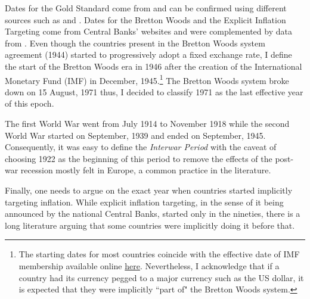 \documentclass[12pt]{article}
\begin{document}
\begin{appendices}
Dates for the Gold Standard come from \cite{Reinhart2009} and can be confirmed using different sources such as \cite{Bordo1996} and \cite{Diebold1991}. Dates for the Bretton Woods and the Explicit Inflation Targeting come from Central Banks' websites and were complemented by data from \cite{Ilzetzki2019}. Even though the countries present in the Bretton Woods system agreement (1944) started to progressively adopt a fixed exchange rate, I define the start of the Bretton Woods era in 1946 after the creation of the International Monetary Fund (IMF) in December, 1945.\footnote{The starting dates for most countries coincide with the effective date of IMF membership available online \href{https://www.imf.org/external/np/sec/memdir/memdate.htm}{here}. Nevertheless, I acknowledge that if a country had its currency pegged to a major currency such as the US dollar, it is expected that they were implicitly ``part of" the Bretton Woods system.} The Bretton Woods system broke down on 15 August, 1971 thus, I decided to classify 1971 as the last effective year of this epoch.

The first World War went from July 1914 to November 1918 while the second World War started on September, 1939 and ended on September, 1945. Consequently, it was easy to define the \textit{Interwar Period} with the caveat of choosing 1922 as the beginning of this period to remove the effects of the post-war recession mostly felt in Europe, a common practice in the literature.


Finally, one needs to argue on the exact year when countries started implicitly targeting inflation. While explicit inflation targeting, in the sense of it being announced by the national Central Banks, started only in the nineties, there is a long literature arguing that some countries were implicitly doing it before that.


\end{appendices}
\end{document}
